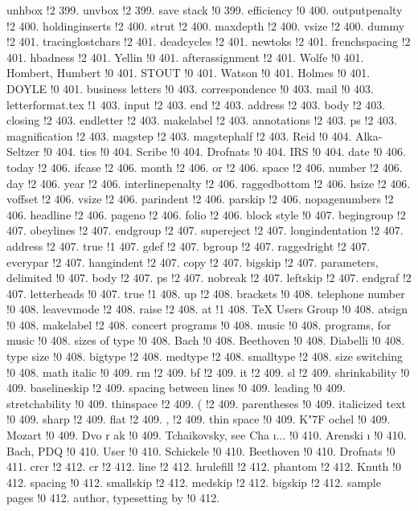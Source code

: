 unhbox !2 399.
unvbox !2 399.
save stack !0 399.
efficiency !0 400.
outputpenalty !2 400.
holdinginserts !2 400.
strut !2 400.
maxdepth !2 400.
vsize !2 400.
dummy !2 401.
tracinglostchars !2 401.
deadcycles !2 401.
newtoks !2 401.
frenchspacing !2 401.
hbadness !2 401.
Yellin !0 401.
afterassignment !2 401.
Wolfe !0 401.
Hombert, Humbert !0 401.
STOUT !0 401.
Watson !0 401.
Holmes !0 401.
DOYLE !0 401.
business letters !0 403.
correspondence !0 403.
mail !0 403.
letterformat.tex !1 403.
input !2 403.
end !2 403.
address !2 403.
body !2 403.
closing !2 403.
endletter !2 403.
makelabel !2 403.
annotations !2 403.
ps !2 403.
magnification !2 403.
magstep !2 403.
magstephalf !2 403.
Reid !0 404.
Alka-Seltzer !0 404.
ties !0 404.
Scribe !0 404.
Drofnats !0 404.
IRS !0 404.
date !0 406.
today !2 406.
ifcase !2 406.
month !2 406.
or !2 406.
space !2 406.
number !2 406.
day !2 406.
year !2 406.
interlinepenalty !2 406.
raggedbottom !2 406.
hsize !2 406.
voffset !2 406.
vsize !2 406.
parindent !2 406.
parskip !2 406.
nopagenumbers !2 406.
headline !2 406.
pageno !2 406.
folio !2 406.
block style !0 407.
begingroup !2 407.
obeylines !2 407.
endgroup !2 407.
supereject !2 407.
longindentation !2 407.
address !2 407.
true !1 407.
gdef !2 407.
bgroup !2 407.
raggedright !2 407.
everypar !2 407.
hangindent !2 407.
copy !2 407.
bigskip !2 407.
parameters, delimited !0 407.
body !2 407.
ps !2 407.
nobreak !2 407.
leftskip !2 407.
endgraf !2 407.
letterheads !0 407.
true !1 408.
up !2 408.
brackets !0 408.
telephone number !0 408.
leavevmode !2 408.
raise !2 408.
at !1 408.
TeX Users Group !0 408.
atsign !0 408.
makelabel !2 408.
concert programs !0 408.
music !0 408.
programs, for music !0 408.
sizes of type !0 408.
Bach !0 408.
Beethoven !0 408.
Diabelli !0 408.
type size !0 408.
bigtype !2 408.
medtype !2 408.
smalltype !2 408.
size switching !0 408.
math italic !0 409.
rm !2 409.
bf !2 409.
it !2 409.
sl !2 409.
shrinkability !0 409.
baselineskip !2 409.
spacing between lines !0 409.
leading !0 409.
stretchability !0 409.
thinspace !2 409.
( !2 409.
parentheses !0 409.
italicized text !0 409.
sharp !2 409.
flat !2 409.
, !2 409.
thin space !0 409.
K{\accent "7F o}chel !0 409.
Mozart !0 409.
Dvo{ r}{ a}k !0 409.
Tchaikovsky, see Cha{ \i }... !0 410.
Arenski{ \i } !0 410.
Bach, PDQ !0 410.
User !0 410.
Schickele !0 410.
Beethoven !0 410.
Drofnats !0 411.
crcr !2 412.
cr !2 412.
line !2 412.
hrulefill !2 412.
phantom !2 412.
Knuth !0 412.
spacing !0 412.
smallskip !2 412.
medskip !2 412.
bigskip !2 412.
sample pages !0 412.
author, typesetting by !0 412.
